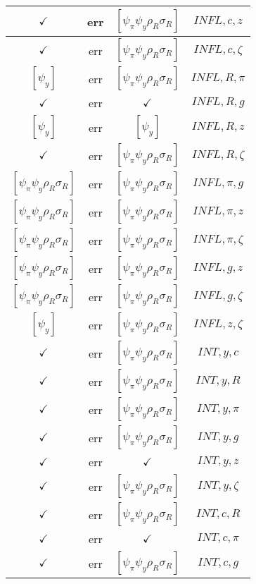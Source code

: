 \documentclass[a4paper,10pt]{article}
\begin{document}
\begin{longtable}{|c|c|c|c|}
\hline
$\checkmark$ & err & $[\psi_\pi \psi_y \rho_R \sigma_R ]$ & ${INFL},{c},{z}$ \\
\hline
$\checkmark$ & err & $[\psi_\pi \psi_y \rho_R \sigma_R ]$ & ${INFL},{c},{\zeta}$ \\
\hline
$[\psi_y ]$ & err & $[\psi_\pi \psi_y \rho_R \sigma_R ]$ & ${INFL},{R},{\pi}$ \\
\hline
$\checkmark$ & err & $\checkmark$ & ${INFL},{R},{g}$ \\
\hline
$[\psi_y ]$ & err & $[\psi_y ]$ & ${INFL},{R},{z}$ \\
\hline
$\checkmark$ & err & $[\psi_\pi \psi_y \rho_R \sigma_R ]$ & ${INFL},{R},{\zeta}$ \\
\hline
$[\psi_\pi \psi_y \rho_R \sigma_R ]$ & err & $[\psi_\pi \psi_y \rho_R \sigma_R ]$ & ${INFL},{\pi},{g}$ \\
\hline
$[\psi_\pi \psi_y \rho_R \sigma_R ]$ & err & $[\psi_\pi \psi_y \rho_R \sigma_R ]$ & ${INFL},{\pi},{z}$ \\
\hline
$[\psi_\pi \psi_y \rho_R \sigma_R ]$ & err & $[\psi_\pi \psi_y \rho_R \sigma_R ]$ & ${INFL},{\pi},{\zeta}$ \\
\hline
$[\psi_\pi \psi_y \rho_R \sigma_R ]$ & err & $[\psi_\pi \psi_y \rho_R \sigma_R ]$ & ${INFL},{g},{z}$ \\
\hline
$[\psi_\pi \psi_y \rho_R \sigma_R ]$ & err & $[\psi_\pi \psi_y \rho_R \sigma_R ]$ & ${INFL},{g},{\zeta}$ \\
\hline
$[\psi_y ]$ & err & $[\psi_\pi \psi_y \rho_R \sigma_R ]$ & ${INFL},{z},{\zeta}$ \\
\hline
$\checkmark$ & err & $[\psi_\pi \psi_y \rho_R \sigma_R ]$ & ${INT},{y},{c}$ \\
\hline
$\checkmark$ & err & $[\psi_\pi \psi_y \rho_R \sigma_R ]$ & ${INT},{y},{R}$ \\
\hline
$\checkmark$ & err & $[\psi_\pi \psi_y \rho_R \sigma_R ]$ & ${INT},{y},{\pi}$ \\
\hline
$\checkmark$ & err & $[\psi_\pi \psi_y \rho_R \sigma_R ]$ & ${INT},{y},{g}$ \\
\hline
$\checkmark$ & err & $\checkmark$ & ${INT},{y},{z}$ \\
\hline
$\checkmark$ & err & $[\psi_\pi \psi_y \rho_R \sigma_R ]$ & ${INT},{y},{\zeta}$ \\
\hline
$\checkmark$ & err & $[\psi_\pi \psi_y \rho_R \sigma_R ]$ & ${INT},{c},{R}$ \\
\hline
$\checkmark$ & err & $\checkmark$ & ${INT},{c},{\pi}$ \\
\hline
$\checkmark$ & err & $[\psi_\pi \psi_y \rho_R \sigma_R ]$ & ${INT},{c},{g}$ \\

\end{longtable}
\end{document}
